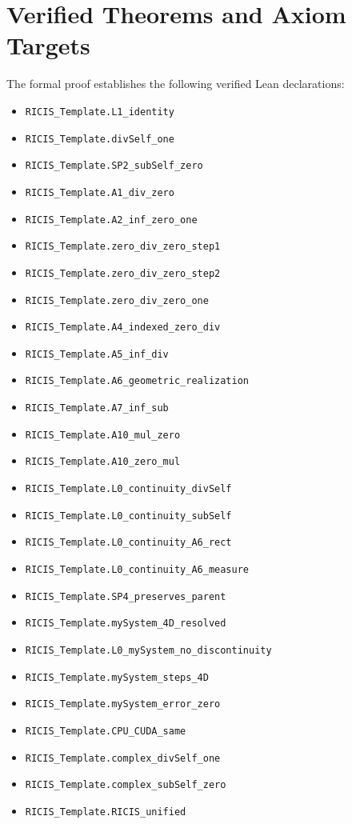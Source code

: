 \documentclass[11pt,a4paper]{article}
\begin{document}
\section{Verified Theorems and Axiom Targets}
The formal proof establishes the following verified Lean declarations:
\begin{itemize}
  \item \texttt{RICIS_Template.L1_identity}
  \item \texttt{RICIS_Template.divSelf_one}
  \item \texttt{RICIS_Template.SP2_subSelf_zero}
  \item \texttt{RICIS_Template.A1_div_zero}
  \item \texttt{RICIS_Template.A2_inf_zero_one}
  \item \texttt{RICIS_Template.zero_div_zero_step1}
  \item \texttt{RICIS_Template.zero_div_zero_step2}
  \item \texttt{RICIS_Template.zero_div_zero_one}
  \item \texttt{RICIS_Template.A4_indexed_zero_div}
  \item \texttt{RICIS_Template.A5_inf_div}
  \item \texttt{RICIS_Template.A6_geometric_realization}
  \item \texttt{RICIS_Template.A7_inf_sub}
  \item \texttt{RICIS_Template.A10_mul_zero}
  \item \texttt{RICIS_Template.A10_zero_mul}
  \item \texttt{RICIS_Template.L0_continuity_divSelf}
  \item \texttt{RICIS_Template.L0_continuity_subSelf}
  \item \texttt{RICIS_Template.L0_continuity_A6_rect}
  \item \texttt{RICIS_Template.L0_continuity_A6_measure}
  \item \texttt{RICIS_Template.SP4_preserves_parent}
  \item \texttt{RICIS_Template.mySystem_4D_resolved}
  \item \texttt{RICIS_Template.L0_mySystem_no_discontinuity}
  \item \texttt{RICIS_Template.mySystem_steps_4D}
  \item \texttt{RICIS_Template.mySystem_error_zero}
  \item \texttt{RICIS_Template.CPU_CUDA_same}
  \item \texttt{RICIS_Template.complex_divSelf_one}
  \item \texttt{RICIS_Template.complex_subSelf_zero}
  \item \texttt{RICIS_Template.RICIS_unified}
\end{itemize}
\end{document}
